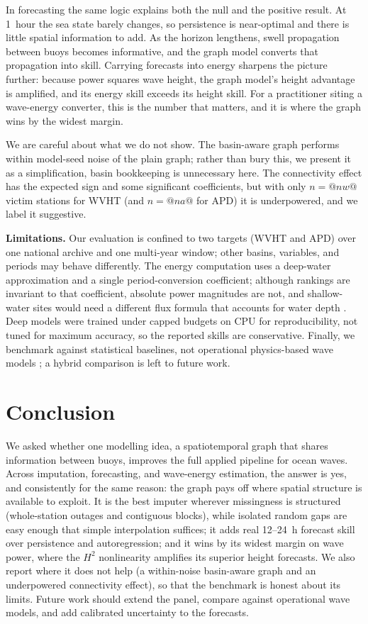 \documentclass[11pt]{article}
\begin{document}
In forecasting the same logic explains both the null and the positive result.
At 1~hour the sea state barely changes, so persistence is near-optimal and there
is little spatial information to add. As the horizon lengthens, swell propagation
between buoys becomes informative, and the graph model converts that propagation
into skill. Carrying forecasts into energy sharpens the picture further: because
power squares wave height, the graph model's height advantage is amplified, and
its energy skill exceeds its height skill. For a practitioner siting a wave-energy
converter, this is the number that matters, and it is where the graph wins by the
widest margin.

We are careful about what we do not show. The basin-aware graph performs within
model-seed noise of the plain graph; rather than bury this, we present it as a
simplification, basin bookkeeping is unnecessary here. The connectivity effect
has the expected sign and some significant coefficients, but with only
$n=@nw@$ victim stations for WVHT (and $n=@na@$ for APD) it is underpowered, and
we label it suggestive.

\noindent\textbf{Limitations.} Our evaluation is confined to two targets (WVHT
and APD) over one national archive and one multi-year window; other basins,
variables, and periods may behave differently. The energy computation uses a
deep-water approximation and a single period-conversion coefficient; although
rankings are invariant to that coefficient, absolute power magnitudes are not,
and shallow-water sites would need a different flux formula that accounts for
water depth \citep{wang2016}. Deep models were trained under
capped budgets on CPU for reproducibility, not tuned for maximum accuracy, so the
reported skills are conservative. Finally, we benchmark against statistical
baselines, not operational physics-based wave models
\citep{wavewatch3,booij1999};
a hybrid comparison is left to future work.

\section{Conclusion}
\label{sec:conclusion}
We asked whether one modelling idea, a spatiotemporal graph that shares
information between buoys, improves the full applied pipeline for ocean waves.
Across imputation, forecasting, and wave-energy estimation, the answer is yes,
and consistently for the same reason: the graph pays off where spatial structure
is available to exploit. It is the best imputer wherever missingness is
structured (whole-station outages and contiguous blocks), while isolated random
gaps are easy enough that simple interpolation suffices; it adds real 12--24~h
forecast skill over
persistence and autoregression; and it wins by its widest margin on wave power,
where the $H^{2}$ nonlinearity amplifies its superior height forecasts. We also
report where it does not help (a within-noise basin-aware graph and an
underpowered connectivity effect), so that the benchmark is honest about its
limits. Future work should extend the panel, compare against operational wave
models, and add calibrated uncertainty to the forecasts.



\end{document}

